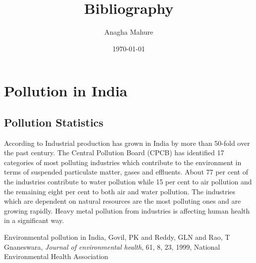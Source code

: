\documentclass[12pt]{report}
\author{\large Anagha Mahure}
\date{\today}
\begin{document}
\raggedright
\title{\huge \bf Bibliography}
\maketitle
{}
\newpage
{}

\newpage
\section{ Pollution in India}

\subsection{Pollution Statistics}

According to \cite{govil1999environmental} Industrial production has grown in India by more than 50-fold over the past century. The Central Pollution Board (CPCB) has identified 17 categories of most polluting industries which contribute to the environment in terms of suspended particulate matter, gases and effluents. About 77 per cent of the industries contribute to water pollution while 15 per cent to air pollution and the remaining eight per cent to both air and water pollution. The industries which are dependent on natural resources are the most polluting ones and are growing rapidly. Heavy metal pollution from industries is affecting human health in a significant way.


\begin{thebibliography} {}

Environmental pollution in India, Govil, PK and Reddy, GLN and Rao, T Gnaneswara, \emph{Journal of environmental health}, 61, 8, 23, 1999, National Environmental Health Association
\end{thebibliography}
\end{document}
